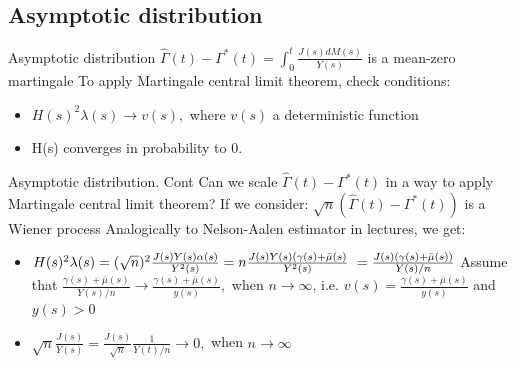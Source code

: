 \documentclass{beamer}
\begin{document}
\subsection{Asymptotic distribution}
\begin{frame}{Asymptotic distribution}
$\hat\Gamma(t) - \Gamma^*(t) = \int_0^t \frac{J(s) dM(s)}{Y(s)}$ is a mean-zero martingale
\newline
\newline
To apply Martingale central limit theorem, check conditions:
\begin{itemize}
    \item $H(s)^2 \lambda(s) \rightarrow v(s),$ where $v(s)$ a deterministic function
    \item H(s) converges in probability to 0.
\end{itemize}
\end{frame}
   
\begin{frame}{Asymptotic distribution. Cont}
Can we scale $\hat\Gamma(t) - \Gamma^*(t)$ in a way to apply Martingale central limit theorem? If we consider:
$\sqrt{n}(\hat\Gamma(t) - \Gamma^*(t))$ is a Wiener process  
\newline
Analogically to Nelson-Aalen estimator in lectures, we get:
\newline
\begin{itemize}
    \item $H(s)^2 \lambda(s) =(\sqrt{n})^2 \frac{J(s)Y(s)\alpha(s)}{Y^2(s)} = n\frac{J(s)Y(s)(\gamma(s) + \bar\mu(s)}{Y^2(s)} \\\
    = \frac{J(s)(\gamma(s)+\bar\mu(s))}{Y(s)/n}$
    \newline
    \newline
    Assume that $\frac{\gamma(s) + \bar\mu(s)}{Y(s)/n} \rightarrow \frac{\gamma(s) + \bar\mu(s)}{y(s)} ,$ when $n \rightarrow \infty$, i.e. $v(s) = \frac{\gamma(s) + \bar\mu(s)}{y(s)}$ and $y(s) > 0$
    
    
    \item $\sqrt{n}\frac{J(s)}{Y(s)} = \frac{J(s)}{\sqrt{n}} \frac{1}{Y(t) / n} \rightarrow 0,$ when $n \rightarrow \infty$
    
\end{itemize}
\end{frame}
\end{document}
